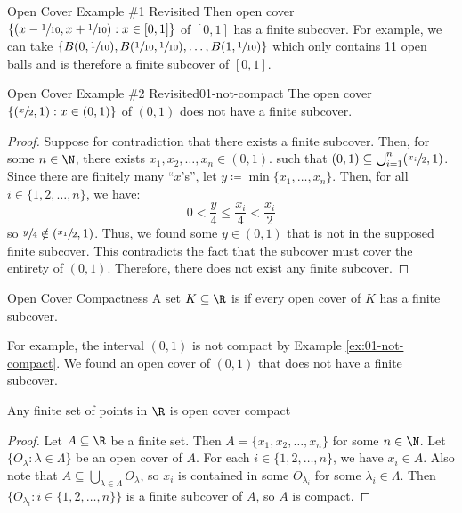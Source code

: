 \begin{exbox}{Open Cover Example \#1 Revisited}{}
    Then open cover $\left\{ (x - \sfrac{1}{10}, x + \sfrac{1}{10}) : x \in [0,1] \right\}$ of $[0,1]$ has a finite subcover.
    \tcblower
    For example, we can take $\{ B(0, \sfrac{1}{10}), B(\sfrac{1}{10}, \sfrac{1}{10}), \ldots, B(1, \sfrac{1}{10}) \}$ which only contains 11 open balls and is therefore a finite subcover of $[0,1]$.
\end{exbox}

\begin{exbox}{Open Cover Example \#2 Revisited}{01-not-compact}
    The open cover $\left\{ (\sfrac{x}{2}, 1) : x \in (0,1) \right\}$ of $(0,1)$ does not have a finite subcover.
    \tcblower
    \begin{proof}
        Suppose for contradiction that there exists a finite subcover. Then, for some $n \in \N$, there exists $x_1, x_2, \ldots, x_n \in (0,1)$. such that $(0,1) \subseteq \bigcup_{i = 1}^{n} (\sfrac{x_i}{2}, 1)$. Since there are finitely many ``$x$'s'', let $y \coloneq \min\{x_1, \ldots, x_n\}$. Then, for all $i \in \{1, 2, \ldots, n\}$, we have:
        \[ 0 < \frac{y}{4} \leq \frac{x_i}{4} < \frac{x_i}{2} \]
        so $\sfrac{y}{4} \notin (\sfrac{x_1}{2}, 1)$. Thus, we found some $y \in (0,1)$ that is not in the supposed finite subcover. This contradicts the fact that the subcover must cover the entirety of $(0,1)$. Therefore, there does not exist any finite subcover.
    \end{proof}
\end{exbox}

\begin{dfnbox}{Open Cover Compactness}{}
    A set $K \subseteq \R$ is  if every open cover of $K$ has a finite subcover.
\end{dfnbox}

For example, the interval $(0,1)$ is not compact by Example \ref{ex:01-not-compact}. We found an open cover of $(0,1)$ that does not have a finite subcover.

\begin{exbox}{Any finite set of points in $\R$ is open cover compact}{}
    \begin{proof}
        Let $A \subseteq \R$ be a finite set. Then $A = \{x_1, x_2, \ldots, x_n\}$ for some $n \in \N$. Let $\{O_\lambda : \lambda \in \Lambda\}$ be an open cover of $A$. For each $i \in \{1, 2, \ldots, n\}$, we have $x_i \in A$. Also note that $A \subseteq \bigcup_{\lambda \in \Lambda} O_\lambda$, so $x_i$ is contained in some $O_{\lambda_i}$ for some $\lambda_i \in \Lambda$. Then $\{O_{\lambda_i} : i \in \{1, 2, \ldots, n\} \}$ is a finite subcover of $A$, so $A$ is compact.
    \end{proof}
\end{exbox}

